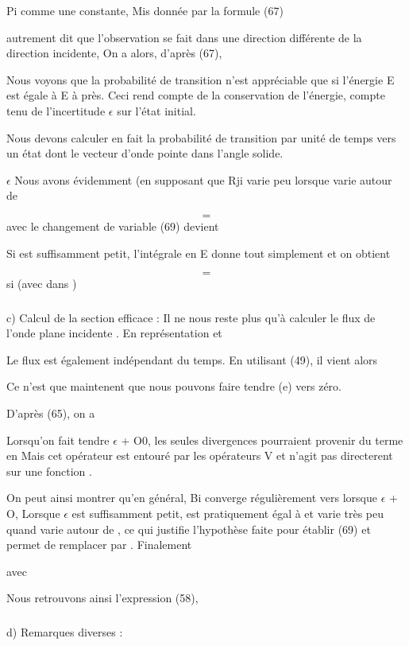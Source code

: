Pi comme une constante, Mis donnée par la formule (67)

autrement dit que l'observation se fait dans une direction différente de
la direction incidente, On a alors, d'après (67),

Nous voyons que la probabilité de transition n'est appréciable
que si l'énergie E est égale à E à  près. Ceci rend compte de la conservation
de l'énergie, compte tenu de l'incertitude $\epsilon$ sur l'état initial.

Nous devons calculer en fait la probabilité de transition par
unité de temps vers un état dont le vecteur d'onde  pointe
dans l'angle solide.


 $\epsilon$ 
Nous avons évidemment (en supposant que Rji varie peu lorsque
 varie autour de 

\[
\tag{69}=
\]
avec le changement de variable
 (69) devient

Si  est suffisamment petit, l'intégrale en E donne tout simplement 
et on obtient

\[
\tag{70}=
\]
si (avec  dans )

\subsubsection{}%
c) Calcul de la section efficace :
Il ne nous reste plus qu'à calculer le flux de l'onde plane
incidente . En représentation  et 

Le flux est également indépendant du temps. En utilisant (49), il vient
alors

Ce n'est que maintenent que nous pouvons faire tendre (e) vers zéro.

D'après (65), on a


Lorsqu'on fait tendre $\epsilon$ + O0, les seules divergences pourraient provenir
du terme en  Mais cet opérateur est entouré par les opérateurs V et n'agit pas
directerent sur une fonction .

On peut ainsi montrer qu'en général, Bi converge régulièrement vers
 lorsque $\epsilon$ + O, Lorsque $\epsilon$ est suffisamment petit,
 est pratiquement égal à  et varie très peu quand  varie autour
de , ce qui justifie l'hypothèse faite pour établir (69) et permet de
remplacer  par .
Finalement

avec 

Nous retrouvons ainsi l'expression (58),

\subsubsection{}%
d) Remarques diverses :

